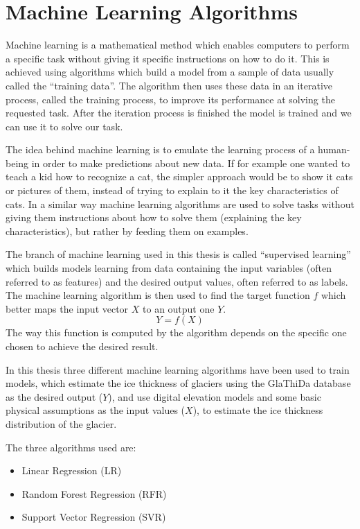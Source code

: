 \section{Machine Learning Algorithms}\label{ML}
Machine learning is a mathematical method which enables computers to perform a specific task without giving it specific instructions on how to do it. This is achieved using algorithms which build a model from a sample of data usually called the ``training data''. The algorithm then uses these data in an iterative process, called the training process, to improve its performance at solving the requested task. After the iteration process is finished the model is trained and we can use it to solve our task. 

The idea behind machine learning is to emulate the learning process of a human-being in order to make predictions about new data. If for example one wanted to teach a kid how to recognize a cat, the simpler approach would be to show it cats or pictures of them, instead of trying to explain to it the key characteristics of cats. In a similar way machine learning algorithms are used to solve tasks without giving them instructions about how to solve them (explaining the key characteristics), but rather by feeding them on examples.

The branch of machine learning used in this thesis is called ``supervised learning'' which builds models learning from data containing the input variables (often referred to as features) and the desired output values, often referred to as labels.
The machine learning algorithm is then used to find the target function $f$ which better maps the input vector $X$ to an output one $Y$.
\begin{equation}
Y = f(X)
\end{equation}
The way this function is computed by the algorithm depends on the specific one chosen to achieve the desired result.

In this thesis three different machine learning algorithms have been used to train models, which estimate the ice thickness of glaciers using the GlaThiDa database as the desired output ($Y$), and use digital elevation models and some basic physical assumptions as the input values ($X$), to estimate the ice thickness distribution of the glacier.

The three algorithms used are:
\begin{itemize}
	\item Linear Regression (LR)
	\item Random Forest Regression (RFR)
	\item Support Vector Regression (SVR)
\end{itemize}

